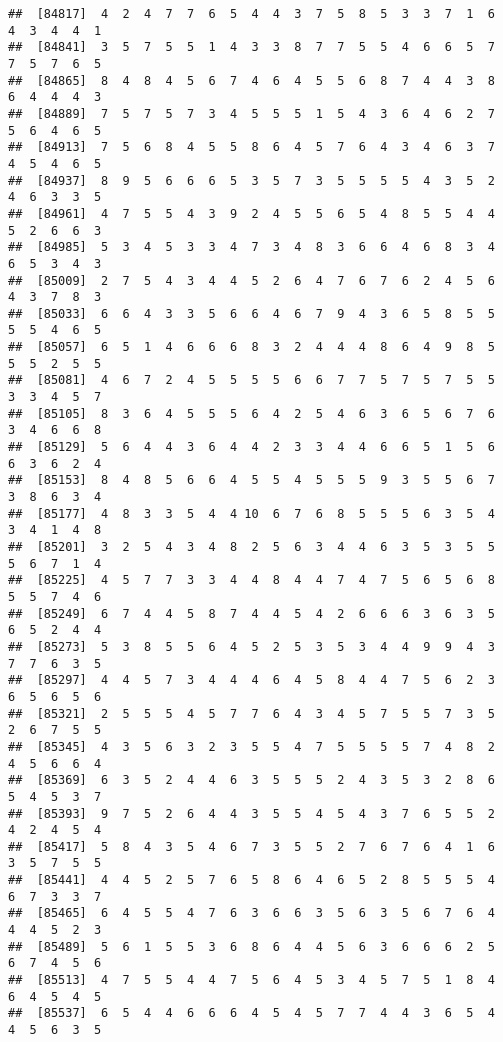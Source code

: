 \documentclass[
]{book}
\begin{document}
\begin{verbatim}
##  [84817]  4  2  4  7  7  6  5  4  4  3  7  5  8  5  3  3  7  1  6  4  3  4  4  1
##  [84841]  3  5  7  5  5  1  4  3  3  8  7  7  5  5  4  6  6  5  7  7  5  7  6  5
##  [84865]  8  4  8  4  5  6  7  4  6  4  5  5  6  8  7  4  4  3  8  6  4  4  4  3
##  [84889]  7  5  7  5  7  3  4  5  5  5  1  5  4  3  6  4  6  2  7  5  6  4  6  5
##  [84913]  7  5  6  8  4  5  5  8  6  4  5  7  6  4  3  4  6  3  7  4  5  4  6  5
##  [84937]  8  9  5  6  6  6  5  3  5  7  3  5  5  5  5  4  3  5  2  4  6  3  3  5
##  [84961]  4  7  5  5  4  3  9  2  4  5  5  6  5  4  8  5  5  4  4  5  2  6  6  3
##  [84985]  5  3  4  5  3  3  4  7  3  4  8  3  6  6  4  6  8  3  4  6  5  3  4  3
##  [85009]  2  7  5  4  3  4  4  5  2  6  4  7  6  7  6  2  4  5  6  4  3  7  8  3
##  [85033]  6  6  4  3  3  5  6  6  4  6  7  9  4  3  6  5  8  5  5  5  5  4  6  5
##  [85057]  6  5  1  4  6  6  6  8  3  2  4  4  4  8  6  4  9  8  5  5  5  2  5  5
##  [85081]  4  6  7  2  4  5  5  5  5  6  6  7  7  5  7  5  7  5  5  3  3  4  5  7
##  [85105]  8  3  6  4  5  5  5  6  4  2  5  4  6  3  6  5  6  7  6  3  4  6  6  8
##  [85129]  5  6  4  4  3  6  4  4  2  3  3  4  4  6  6  5  1  5  6  6  3  6  2  4
##  [85153]  8  4  8  5  6  6  4  5  5  4  5  5  5  9  3  5  5  6  7  3  8  6  3  4
##  [85177]  4  8  3  3  5  4  4 10  6  7  6  8  5  5  5  6  3  5  4  3  4  1  4  8
##  [85201]  3  2  5  4  3  4  8  2  5  6  3  4  4  6  3  5  3  5  5  5  6  7  1  4
##  [85225]  4  5  7  7  3  3  4  4  8  4  4  7  4  7  5  6  5  6  8  5  5  7  4  6
##  [85249]  6  7  4  4  5  8  7  4  4  5  4  2  6  6  6  3  6  3  5  6  5  2  4  4
##  [85273]  5  3  8  5  5  6  4  5  2  5  3  5  3  4  4  9  9  4  3  7  7  6  3  5
##  [85297]  4  4  5  7  3  4  4  4  6  4  5  8  4  4  7  5  6  2  3  6  5  6  5  6
##  [85321]  2  5  5  5  4  5  7  7  6  4  3  4  5  7  5  5  7  3  5  2  6  7  5  5
##  [85345]  4  3  5  6  3  2  3  5  5  4  7  5  5  5  5  7  4  8  2  4  5  6  6  4
##  [85369]  6  3  5  2  4  4  6  3  5  5  5  2  4  3  5  3  2  8  6  5  4  5  3  7
##  [85393]  9  7  5  2  6  4  4  3  5  5  4  5  4  3  7  6  5  5  2  4  2  4  5  4
##  [85417]  5  8  4  3  5  4  6  7  3  5  5  2  7  6  7  6  4  1  6  3  5  7  5  5
##  [85441]  4  4  5  2  5  7  6  5  8  6  4  6  5  2  8  5  5  5  4  6  7  3  3  7
##  [85465]  6  4  5  5  4  7  6  3  6  6  3  5  6  3  5  6  7  6  4  4  4  5  2  3
##  [85489]  5  6  1  5  5  3  6  8  6  4  4  5  6  3  6  6  6  2  5  6  7  4  5  6
##  [85513]  4  7  5  5  4  4  7  5  6  4  5  3  4  5  7  5  1  8  4  6  4  5  4  5
##  [85537]  6  5  4  4  6  6  6  4  5  4  5  7  7  4  4  3  6  5  4  4  5  6  3  5

\end{verbatim}
\end{document}
